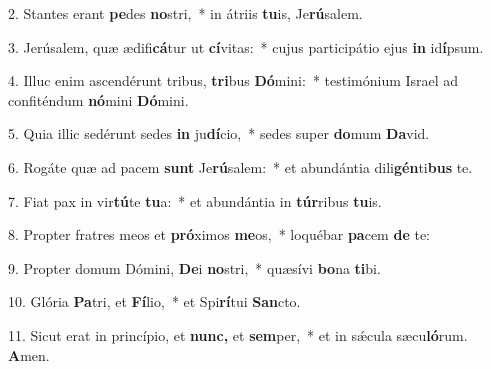 \item 2. Stantes erant \textbf{pe}des \textbf{no}stri,~* in átriis \textbf{tu}is, Je\textbf{rú}salem.
\item 3. Jerúsalem, quæ ædifi\textbf{cá}tur ut \textbf{cí}vitas:~* cujus participátio ejus \textbf{in} id\textbf{í}psum.
\item 4. Illuc enim ascendérunt tribus, \textbf{tri}bus \textbf{Dó}mini:~* testimónium Israel ad confiténdum \textbf{nó}mini \textbf{Dó}mini.
\item 5. Quia illic sedérunt sedes \textbf{in} ju\textbf{dí}cio,~* sedes super \textbf{do}mum \textbf{Da}vid.
\item 6. Rogáte quæ ad pacem \textbf{sunt} Je\textbf{rú}salem:~* et abundántia dili\textbf{gén}ti\textbf{bus} te.
\item 7. Fiat pax in vir\textbf{tú}te \textbf{tu}a:~* et abundántia in \textbf{túr}ribus \textbf{tu}is.
\item 8. Propter fratres meos et \textbf{pró}ximos \textbf{me}os,~* loquébar \textbf{pa}cem \textbf{de} te:
\item 9. Propter domum Dómini, \textbf{De}i \textbf{no}stri,~* quæsívi \textbf{bo}na \textbf{ti}bi.
\item 10. Glória \textbf{Pa}tri, et \textbf{Fí}lio,~* et Spi\textbf{rí}tui \textbf{San}cto.
\item 11. Sicut erat in princípio, et \textbf{nunc,} et \textbf{sem}per,~* et in sǽcula sæcu\textbf{ló}rum. \textbf{A}men.
